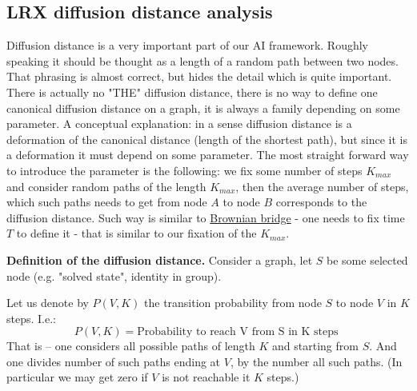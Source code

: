 \documentclass[reqno,11pt]{amsart}
\begin{document}



\clearpage
\subsection{LRX diffusion distance analysis}\label{sec-dif-dist}

Diffusion distance is a very important part of our AI framework. 
Roughly speaking it should be thought as a length of a random path between two nodes. 
That phrasing is almost correct, but hides the  detail which is quite important. There is actually no "THE" diffusion distance,
there is no way to define one canonical diffusion distance on a graph, it is always a family depending on some parameter. 
A conceptual explanation: 
in a sense diffusion distance is a deformation of the canonical distance (length of the shortest path),
but since it is a deformation it must depend on some parameter. 
The most straight forward way to introduce the parameter is the following:
we fix some number of steps $K_{max}$ and consider random paths of the length $K_{max}$, then the average number of steps,
which such paths needs to get from node $A$ to node $B$ corresponds to the diffusion distance. 
Such way is similar to \href{https://en.wikipedia.org/wiki/Brownian_bridge}{Brownian bridge}  -  one needs to fix time $T$ to define it - that is similar to our fixation of the $K_{max}$.  

{\bf Definition of the diffusion distance. } Consider a graph, let $S$ be some selected node (e.g. "solved state", identity in group). 

Let us denote by $P(V,K)$ the transition probability from node $S$ to node $V$ in $K$ steps. I.e.: 
\begin{equation}
    P(V,K) = \text{Probability to reach V from S in K steps }
    \label{eq:P}
\end{equation}
That is -- one considers all possible paths of length $K$ and starting from $S$. And one divides number of such paths ending at $V$, by the number all such paths. (In particular we may get zero if $V$ is not reachable it $K$ steps.)
\end{document}

